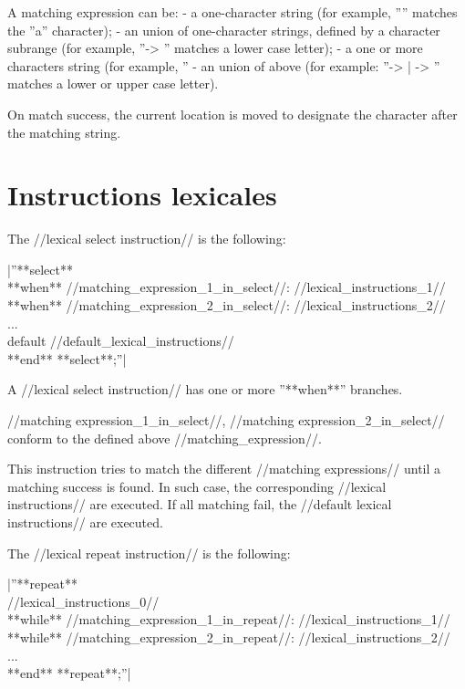 {A matching expression can be:
  - a one-character string (for example, ''\textquotesingle'' matches the ''a'' character);
  - an union of one-character strings, defined by a character subrange (for example, ''\textquotesingle -> \textquotesingle'' matches a lower case letter);
  - a one or more characters string (for example, ''%
  - an union of above (for example: ''\textquotesingle -> \textquotesingle | \textquotesingle -> \textquotesingle'' matches a lower or upper case letter).

On match success, the current location is moved to designate the character after the matching string.

\section{Instructions lexicales}



The //lexical select instruction// is the following:

|''**select**\\ **when** //matching\_expression\_1\_in\_select//: //lexical\_instructions\_1//\\ **when** //matching\_expression\_2\_in\_select//: //lexical\_instructions\_2//\\ ...\\ default //default\_lexical\_instructions//\\ **end** **select**;''|

A //lexical select instruction// has one or more ''**when**'' branches.

//matching expression\_1\_in\_select//, //matching expression\_2\_in\_select// conform to the defined above //matching\_expression//.

This instruction tries to match the different //matching expressions// until a matching success is found. In such case, the corresponding //lexical instructions// are executed. If all matching fail, the //default lexical instructions// are executed.


The //lexical repeat instruction// is the following:

|''**repeat**\\  //lexical\_instructions\_0//\\ **while** //matching\_expression\_1\_in\_repeat//: //lexical\_instructions\_1//\\ **while** //matching\_expression\_2\_in\_repeat//: //lexical\_instructions\_2//\\ ...\\ **end** **repeat**;''|

}
